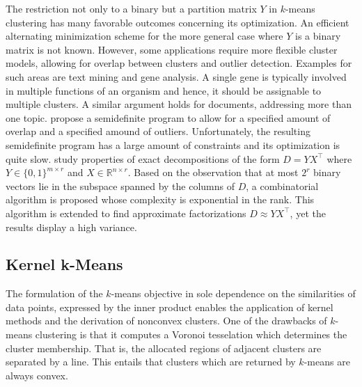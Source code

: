 The restriction not only to a binary but a partition matrix $Y$ in $k$-means clustering has many favorable outcomes concerning its optimization. An efficient alternating minimization scheme for the more general case where $Y$ is a binary matrix is not known.   However, some applications require more flexible cluster models, allowing for overlap between clusters and outlier detection. Examples for such areas are text mining and gene analysis. A single gene is typically involved in multiple functions of an organism and hence, it should be assignable to multiple clusters. A similar argument holds for documents, addressing more than one topic. \cite{whang2018non} propose a semidefinite program to allow for a specified amount of overlap and a specified amound of outliers. Unfortunately, the resulting semidefinite program has a large amount of constraints and its optimization is quite slow.
\cite{slawski2013matrix} study properties of exact decompositions of the form $D= YX^\top$ where $Y\in\{0,1\}^{m\times r}$ and $X\in\mathbb{R}^{n\times r}$. Based on the observation that at most $2^r$ binary vectors lie in the subspace spanned by the columns of $D$, a combinatorial algorithm is proposed whose complexity is exponential in the rank. This algorithm is extended to find approximate factorizations $D\approx YX^\top$, yet the results display a high variance. 
\subsection{Kernel k-Means}
The formulation of the $k$-means objective in sole dependence on the similarities of data points, expressed by the inner product enables the application of kernel methods and the derivation of nonconvex clusters. One of the drawbacks of $k$-means clustering is that it computes a Voronoi tesselation which determines the cluster membership. That is, the allocated regions of adjacent clusters are separated by a line. This entails that clusters which are returned by $k$-means are always convex. 

